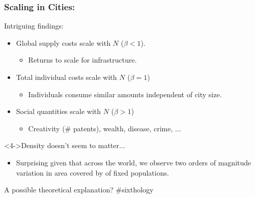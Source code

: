 \begin{frame}
  \frametitle{Scaling in Cities:}

  \begin{block}{Intriguing findings:}
    \begin{itemize}
    \item<1-> 
      Global supply costs scale  with $N$ ($\beta<1$).
      \begin{itemize}
      \item Returns to scale for infrastructure.
      \end{itemize}
    \item<2->
      Total individual costs scale  with $N$ ($\beta=1$)
      \begin{itemize}
      \item Individuals consume similar amounts independent of city size.
      \end{itemize}
    \item<3->
      Social quantities scale  with $N$ ($\beta>1$)
      \begin{itemize}
      \item Creativity (\# patents), wealth, disease, crime, ...
      \end{itemize}
    \end{itemize}
  \end{block}

  \medskip

  \begin{block}<4->{Density doesn't seem to matter...}
    \begin{itemize}
    \item Surprising given that across the world,
      we observe two orders of magnitude variation
      in area covered by
      of fixed populations.
    \end{itemize}
  \end{block}

\end{frame}

\begin{frame}

  \begin{block}{A possible theoretical explanation?}
    \bigskip
    \#sixthology
  \end{block}

\end{frame}


